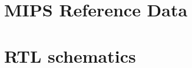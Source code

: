 \begin{appendices}
\appendixpage

\section{MIPS Reference Data}\label{MIPS_SHEET}
%

\section{RTL schematics}
\label{RTL}
%
\end{appendices}
